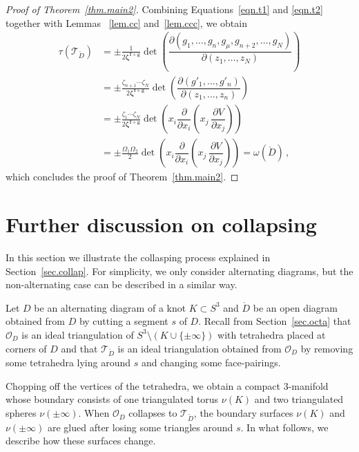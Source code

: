 \documentclass[12pt,reqno]{amsart}
\theoremstyle{definition}
\def\calO{\mathcal O}
\def\calT{\mathcal T}
\renewcommand{\Ddot}{\mathring{D}}
\begin{document}
\begin{proof}[Proof of Theorem~\ref{thm.main2}]
Combining Equations~\eqref{eqn.t1} and \eqref{eqn.t2} together with Lemmas
~\ref{lem.cc} and~\ref{lem.ccc}, we obtain
\begin{align*}
\tau(\calT_{\Ddot}) &= \pm \frac{1}{2{\boldsymbol \zeta}^{\boldsymbol f + \boldsymbol g}}
\det \left(\dfrac{\partial (g_1,\ldots, g_{n}, g_\mu,g_{n+2},\ldots,g_N)}
{\partial (z_1,\ldots,z_N)} \right) \\
&= \pm \frac{\zeta_{n+1} \cdots \zeta_N}{2{\boldsymbol \zeta}^{\boldsymbol f + \boldsymbol g}}
\det \left(\dfrac{\partial (g'_1,\ldots, g'_{n})}{\partial (z_1,\ldots,z_{n})} \right) \\
&=\pm \frac{\zeta_1 \cdots \zeta_N}{2{\boldsymbol \zeta}^{\boldsymbol f + \boldsymbol g}}
\det \left ( x_i \dfrac{\partial}{\partial x_i} \left(x_j\, \dfrac{\partial V}{
\partial x_j} \right)\right)  \\
&=\pm \frac{\Omega_1 \Omega_2}{2} 	\det \left ( x_i \dfrac{\partial}{\partial x_i}
\left(x_j\, \dfrac{\partial V}{ \partial x_j} \right)\right) = \omega(\Ddot)\,,
\end{align*}
which concludes the proof of Theorem~\ref{thm.main2}.
\end{proof}


\appendix

\section{Further discussion on collapsing}
\label{sec.app}

In this section we illustrate the collasping process explained in
Section~\ref{sec.collap}. For simplicity, we only consider alternating diagrams, but
the non-alternating case can be described in a similar way.

Let $D$ be an alternating diagram of a knot $K \subset S^3$ and  $\Ddot$ be
an open diagram obtained from $D$ by cutting a segment $s$ of $D$.
Recall from Section~\ref{sec.octa} that $\calO_D$  is an ideal
triangulation of $S^3 \setminus (K \cup \{ \pm \infty\})$ with tetrahedra placed at
corners of $D$ and that $\calT_{\Ddot}$ is an ideal triangulation obtained from
$\calO_D$ by removing some tetrahedra lying around $s$ and changing some
face-pairings.

Chopping off the vertices of the tetrahedra, we obtain a compact 3-manifold whose
boundary consists of one triangulated torus $\nu(K)$ and two triangulated spheres
$\nu(\pm \infty)$.
When $\calO_D$ collapses to $\calT_{\Ddot}$, the boundary surfaces $\nu(K)$ and
$\nu(\pm \infty)$ are glued after losing some triangles around $s$. In what follows,
we describe how these surfaces change.
\end{document}
